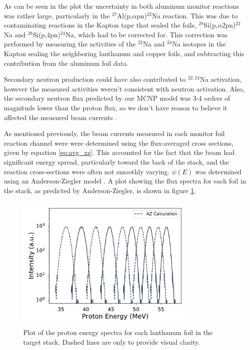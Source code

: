 \documentclass[aps,twocolumn,secnumarabic,balancelastpage,amsmath,amssymb,nofootinbib,floatfix]{revtex4-1}
\begin{document}
As can be seen in the plot the uncertainty in both aluminum monitor reactions was rather large, particularly in the $^{27}$Al(p,$\alpha$pn)$^{22}$Na reaction.  This was due to contaminating reactions in the Kapton tape that sealed the foils, $^{28}$Si(p,$\alpha$2pn)$^{22}$Na and $^{28}$Si(p,4pn)$^{24}$Na, which had to be corrected for.  This correction was performed by measuring the activities of the $^{22}$Na and $^{24}$Na isotopes in the Kapton sealing the neighboring lanthanum and copper foils, and subtracting this contribution from the aluminum foil data.

Secondary neutron production could have also contributed to $^{22,24}$Na activation, however the measured activities weren't consistent with neutron activation. Also, the secondary neutron flux predicted by our MCNP model was 3-4 orders of magnitude lower than the proton flux, so we don't have reason to believe it affected the measured beam currents \cite{MCNP}.

As mentioned previously, the beam currents measured in each monitor foil reaction channel were were determined using the flux-averaged cross sections, given by equation \ref{eq:avg_xs}.  This accounted for the fact that the beam had significant energy spread, particularly toward the back of the stack, and the reaction cross-sections were often not smoothly varying.  $\psi(E)$ was determined using an Anderson-Ziegler model \cite{ZIEGLER20101818}.  A plot showing the flux spectra for each foil in the stack, as predicted by Anderson-Ziegler, is shown in figure \ref{fig:az_spectrum}.

\begin{figure}[htb]
\includegraphics[width=9cm]{monitors/La_az_spectrum}
\caption{Plot of the proton energy spectra for each lanthanum foil in the target stack.  Dashed lines are only to provide visual clarity.
}
\label{fig:az_spectrum}
\end{figure}
\end{document}

